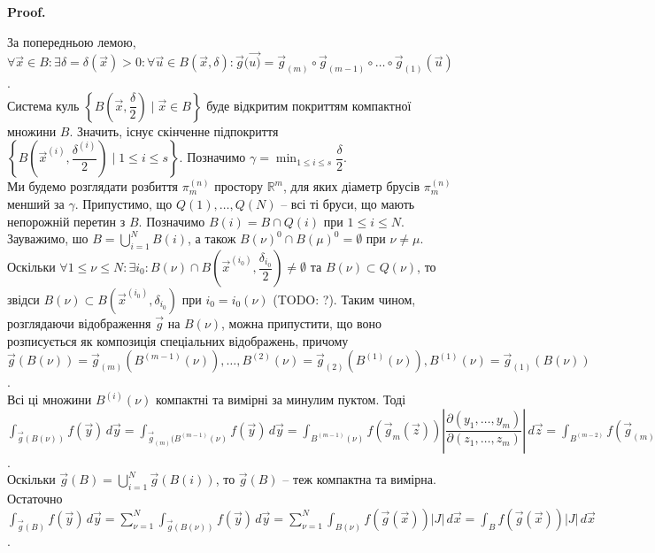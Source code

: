 \documentclass[a4paper, 10pt]{article}
\makeatletter
\def\qed{$\blacksquare$}
\theoremstyle{theoremdd}
\theoremstyle{theoremdd}
\theoremstyle{theoremdd}
\theoremstyle{theoremdd}
\theoremstyle{theoremdd}
\theoremstyle{theoremdd}
\theoremstyle{theoremdd}
\theoremstyle{theoremdd}
\renewenvironment{proof}[1][Proof.\\]{\par
\pushQED{\hfill \qed}%
\normalfont \topsep6\p@\@plus6\p@\relax
\trivlist
\item\relax
{\bfseries
#1\@addpunct{.}}\hspace\labelsep\ignorespaces
}{%
\popQED\endtrivlist\@endpefalse
}
\makeatother
\begin{document}
\begin{proof}
За попередньою лемою, $\forall \vec{x} \in B: \exists \delta = \delta(\vec{x}) > 0: \forall \vec{u} \in B(\vec{x},\delta): \vec{g}(\vec{u)} = \vec{g}_{(m)} \circ \vec{g}_{(m-1)} \circ \dots \circ \vec{g}_{(1)} (\vec{u})$.\\
Система куль $\left\{ B\left(\vec{x}, \dfrac{\delta}{2} \right) \mid \vec{x} \in B \right\}$ буде відкритим покриттям компактної множини $B$. Значить, існує скінченне підпокриття $\left\{ B\left(\vec{x}^{(i)}, \dfrac{\delta^{(i)}}{2}\right) \mid 1 \leq i \leq s \right\}$. Позначимо $\gamma = \displaystyle\min_{1 \leq i \leq s} \dfrac{\delta}{2}$.\\
Ми будемо розглядати розбиття $\pi_m^{(n)}$ простору $\mathbb{R}^m$, для яких діаметр брусів $\pi_m^{(n)}$ менший за $\gamma$. Припустимо, що $Q(1),\dots,Q(N)$ -- всі ті бруси, що мають непорожній перетин з $B$. Позначимо $B(i) = B \cap Q(i)$ при $1 \leq i \leq N$. Зауважимо, шо $B = \displaystyle\bigcup_{i=1}^N B(i)$, а також $B(\nu)^0 \cap B(\mu)^0 = \emptyset$ при $\nu \neq \mu$.\\
Оскільки $\forall 1 \leq \nu \leq N: \exists i_0: B(\nu) \cap B\left( \vec{x}^{(i_0)}, \dfrac{\delta_{i_0}}{2}\right) \neq \emptyset$ та $B(\nu) \subset Q(\nu)$, то звідси $B(\nu) \subset B(\vec{x}^{(i_0)}, \delta_{i_0})$ при $i_0 = i_0(\nu)$ (TODO: ?). Таким чином, розглядаючи відображення $\vec{g}$ на $B(\nu)$, можна припустити, що воно розписується як композиція спеціальних відображень, причому\\
$\vec{g}(B(\nu)) = \vec{g}_{(m)}(B^{(m-1)}(\nu)),\dots, B^{(2)}(\nu) = \vec{g}_{(2)}(B^{(1)}(\nu)), B^{(1)}(\nu) = \vec{g}_{(1)}(B(\nu))$.\\
Всі ці множини $B^{(i)}(\nu)$ компактні та вимірні за минулим пуктом. Тоді\\
$\displaystyle\int_{\vec{g}(B(\nu))} f(\vec{y})\,d\vec{y} = \int_{\vec{g}_{(m)}(B^{(m-1)}(\nu)} f(\vec{y})\,d\vec{y} = \int_{B^{(m-1)}(\nu)} f(\vec{g}_{m}(\vec{z})) \left| \dfrac{\partial (y_1,\dots,y_m)}{\partial(z_1,\dots,z_m)} \right|\,d \vec{z} = \int_{B^{(m-2)}} f(\vec{g}_{(m)}(\vec{g}_{(m-1)}(\vec{u}))) \left| \dfrac{\partial(y_1,\dots,y_m)}{\partial(z_1,\dots,z_m)} \right| \left| \dfrac{\partial(z_1,\dots,z_m)}{\partial(u_1,\dots,u_m)} \right|\,d\vec{u} = \int_{B^{(m-2)}(\nu)} f(\vec{g}_{(m)}(\vec{g}_{(m-1)}(\vec{u}))) \left| \dfrac{\partial(y_1,\dots,y_m)}{\partial(u_1,\dots,u_m)} \right|\,d\vec{u} = \dots = \int_{B(\nu)} f(\vec{g}(\vec{x})) \left| \dfrac{\partial(y_1,\dots,y_m)}{\partial(x_1,\dots,x_m)} \right|\,d\vec{x}$.\\
Оскільки $\vec{g}(B) = \displaystyle\bigcup_{i=1}^N \vec{g}(B(i))$, то $\vec{g}(B)$ -- теж компактна та вимірна. Остаточно\\
$\displaystyle\int_{\vec{g}(B)} f(\vec{y})\,d\vec{y} = \sum_{\nu = 1}^N \int_{\vec{g}(B(\nu))} f(\vec{y})\,d\vec{y} = \sum_{\nu = 1}^N \int_{B(\nu)} f(\vec{g}(\vec{x})) |J|\,d\vec{x} = \int_B f(\vec{g}(\vec{x}))|J|\,d\vec{x}$.
\end{proof}
\end{document}
